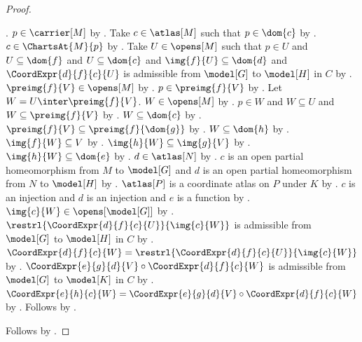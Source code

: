 \begin{proof}
\begin{subproof}
            .
        $p\in\carrier[M]$ by .
        Take $c\in\atlas[M]$ such that $p\in\dom{c}$ by .
        $c\in\ChartsAt{M}{p}$ by .
        Take $U\in\opens[M]$ such that $p\in U$ and $U\subseteq\dom{f}$ and
            $U\subseteq\dom{c}$ and $\img{f}{U}\subseteq\dom{d}$ and
            $\CoordExpr{d}{f}{c}{U}$ is admissible from $\model[G]$ to $\model[H]$ in $C$ by
            .
        $\preimg{f}{V}\in\opens[M]$ by .
        $p\in\preimg{f}{V}$ by .
        Let $W=U\inter\preimg{f}{V}$.
        $W\in\opens[M]$ by .
        $p\in W$ and $W\subseteq U$ and $W\subseteq\preimg{f}{V}$ by .
        $W\subseteq\dom{c}$ by .
        $\preimg{f}{V}\subseteq\preimg{f}{\dom{g}}$ by .
        $W\subseteq\dom{h}$ by .
        $\img{f}{W}\subseteq V$ by .
        $\img{h}{W}\subseteq\img{g}{V}$ by .
        $\img{h}{W}\subseteq\dom{e}$ by .
        $d\in\atlas[N]$ by .
        $c$ is an open partial homeomorphism from $M$ to $\model[G]$ and
            $d$ is an open partial homeomorphism from $N$ to $\model[H]$ by .
        $\atlas[P]$ is a coordinate atlas on $P$ under $K$ by .
        $c$ is an injection and $d$ is an injection and $e$ is a function by
            .
        $\img{c}{W}\in\opens[\model[G]]$ by .
        $\restrl{\CoordExpr{d}{f}{c}{U}}{\img{c}{W}}$ is admissible
            from $\model[G]$ to $\model[H]$ in $C$ by .
        $\CoordExpr{d}{f}{c}{W}=\restrl{\CoordExpr{d}{f}{c}{U}}{\img{c}{W}}$ by
            .
        $\CoordExpr{e}{g}{d}{V}\circ\CoordExpr{d}{f}{c}{W}$ is admissible
            from $\model[G]$ to $\model[K]$ in $C$ by .
        $\CoordExpr{e}{h}{c}{W}=\CoordExpr{e}{g}{d}{V}\circ\CoordExpr{d}{f}{c}{W}$ by
            .
        Follows by .
    \end{subproof}
    Follows by .
\end{proof}

